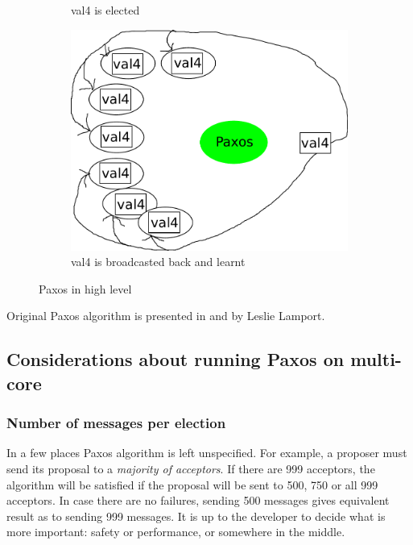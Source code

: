 \documentclass[english,11pt]{l4proj}
\begin{document}
\begin{figure}
\begin{subfigure}[b]{0.32\textwidth}
        \caption{val4 is elected}
    \end{subfigure}\hfill
    \begin{subfigure}[b]{0.32\textwidth}
        \includegraphics[width=\textwidth]{images/paxos3.pdf}
        \caption{val4 is broadcasted back and learnt}
    \end{subfigure}

    \caption{Paxos in high level}
    \label{fig:paxos-highlevel}
\end{figure}

Original Paxos algorithm is presented in \cite{classic-paxos} and
\cite{paxos-simple} by Leslie Lamport.

\subsection{Considerations about running Paxos on multi-core}

\subsubsection{Number of messages per election}

In a few places Paxos algorithm is left unspecified. For example, a proposer
must send its proposal to a {\em majority of acceptors}. If there are 999
acceptors, the algorithm will be satisfied if the proposal will be sent to 500,
750 or all 999 acceptors. In case there are no failures, sending 500 messages
gives equivalent result as to sending 999 messages. It is up to the developer to
decide what is more important: safety or performance, or somewhere in the
middle.
\end{document}
